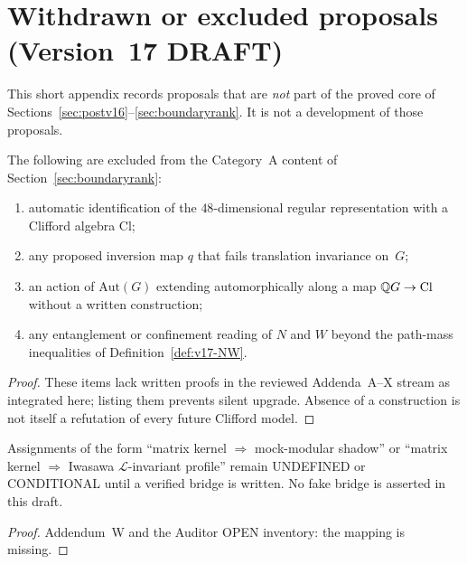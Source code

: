 \section{Withdrawn or excluded proposals (Version~17 DRAFT)}\label{app:withdrawn-v17}
This short appendix records proposals that are \emph{not} part of the proved core of Sections~\ref{sec:postv16}--\ref{sec:boundaryrank}. It is not a development of those proposals.

\begin{proposition}\label{prop:v17-clifford-out}
The following are excluded from the Category~A content of Section~\ref{sec:boundaryrank}:
\begin{enumerate}[label=(\roman*)]
\item automatic identification of the $48$-dimensional regular representation with a Clifford algebra $\mathrm{Cl}$;
\item any proposed inversion map $q$ that fails translation invariance on~$G$;
\item an action of $\mathrm{Aut}(G)$ extending automorphically along a map $\mathbb{Q} G\to\mathrm{Cl}$ without a written construction;
\item any entanglement or confinement reading of $N$ and $W$ beyond the path-mass inequalities of Definition~\ref{def:v17-NW}.
\end{enumerate}
\end{proposition}
\begin{proof}
These items lack written proofs in the reviewed Addenda~A--X stream as integrated here; listing them prevents silent upgrade. Absence of a construction is not itself a refutation of every future Clifford model.
\end{proof}

\begin{proposition}\label{prop:v17-undefined-bridges}
Assignments of the form ``matrix kernel $\Rightarrow$ mock-modular shadow'' or ``matrix kernel $\Rightarrow$ Iwasawa $\mathcal L$-invariant profile'' remain UNDEFINED or CONDITIONAL until a verified bridge is written. No fake bridge is asserted in this draft.
\end{proposition}
\begin{proof}
Addendum~W and the Auditor OPEN inventory: the mapping is missing.
\end{proof}
